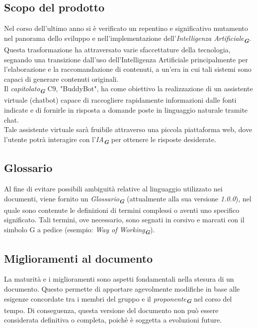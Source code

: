 \subsection{Scopo del prodotto}
Nel corso dell'ultimo anno si è verificato un repentino e significativo mutamento nel panorama
dello sviluppo e nell'implementazione dell'\emph{Intelligenza Artificiale}\textsubscript{\textit{\textbf{G}}}.
Questa trasformazione ha attraversato varie sfaccettature della tecnologia, segnando una transizione dall'uso
dell'Intelligenza Artificiale principalmente per l'elaborazione e la raccomandazione di contenuti, a un'era in
cui tali sistemi sono capaci di generare contenuti originali. \\
Il \emph{capitolato}\textsubscript{\textit{\textbf{G}}} C9, "BuddyBot", ha come obiettivo la realizzazione di un assistente virtuale (chatbot) 
capace di raccogliere rapidamente informazioni dalle fonti indicate e di fornirle in risposta a domande poste in 
linguaggio naturale tramite chat.\\
Tale assistente virtuale sarà fruibile attraverso una piccola piattaforma web, dove l'utente potrà interagire con l'\emph{IA}\textsubscript{\textit{\textbf{G}}} 
per ottenere le risposte desiderate.

\subsection{Glossario}
Al fine di evitare possibili ambiguità relative al linguaggio utilizzato nei documenti, viene fornito un \emph{Glossario}\textsubscript{\textit{\textbf{G}}}
(attualmente alla sua versione \emph{1.0.0}), nel quale sono contenute le definizioni di termini complessi o aventi uno 
specifico significato. Tali termini, ove necessario, sono segnati in corsivo e marcati con il simbolo G a pedice
(esempio: \emph{Way of Working}\textsubscript{\textit{\textbf{G}}}).

\subsection{Miglioramenti al documento}
La maturità e i miglioramenti sono aspetti fondamentali nella stesura di un documento.
Questo permette di apportare agevolmente modifiche in base alle esigenze concordate tra i
membri del gruppo e il \emph{proponente}\textsubscript{\textit{\textbf{G}}} nel corso del tempo. Di conseguenza, questa versione del
documento non può essere considerata definitiva o completa, poichè è soggetta a evoluzioni future.

